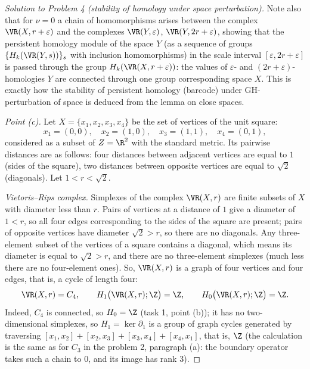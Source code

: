 \documentclass[a4paper,12pt]{report}
\begin{document}
\begin{proof}[Solution to Problem \textup{4} \textup{(}stability of homology under space perturbation\textup{)}]
Note also that for $\nu=0$ a chain of homomorphisms arises between the complex $\VR(X,r+\varepsilon)$ and the complexes $\VR(Y,\varepsilon)$, $\VR(Y,2r+\varepsilon)$, showing that the persistent homology module of the space $Y$ \textup{(}as a sequence of groups $\{H_k(\VR(Y,s))\}_s$ with inclusion homomorphisms\textup{)} in the scale interval $[\varepsilon,2r+\varepsilon]$ is passed through the group $H_k(\VR(X,r+\varepsilon))$: the values of $\varepsilon$- and $(2r+\varepsilon)$-homologies $Y$ are connected through one group corresponding space $X$. This is exactly how the stability of persistent homology \textup{(}barcode\textup{)} under GH-perturbation of space is deduced from the lemma on close spaces.

\textit{Point \textup{(c)}.} Let $X=\{x_1,x_2,x_3,x_4\}$ be the set of vertices of the unit square:
\[
x_1=(0,0),\quad x_2=(1,0),\quad x_3=(1,1),\quad x_4=(0,1),
\]
considered as a subset of $Z=\R^2$ with the standard metric. Its pairwise distances are as follows: four distances between adjacent vertices are equal to $1$ \textup{(}sides of the square\textup{)}, two distances between opposite vertices are equal to $\sqrt2$ \textup{(}diagonals\textup{)}. Let $1<r<\sqrt2$.

\emph{Vietoris--Rips complex.} Simplexes of the complex $\VR(X,r)$ are finite subsets of $X$ with diameter less than $r$. Pairs of vertices at a distance of $1$ give a diameter of $1<r$, so all four edges corresponding to the sides of the square are present; pairs of opposite vertices have diameter $\sqrt2>r$, so there are no diagonals. Any three-element subset of the vertices of a square contains a diagonal, which means its diameter is equal to $\sqrt2>r$, and there are no three-element simplexes \textup{(}much less there are no four-element ones\textup{)}. So, $\VR(X,r)$ is a graph of four vertices and four edges, that is, a cycle of length four:
\[
\VR(X,r)=C_4,\qquad H_1\bigl(\VR(X,r);\Z\bigr)=\Z,\qquad H_0\bigl(\VR(X,r);\Z\bigr)=\Z .
\]
Indeed, $C_4$ is connected, so $H_0=\Z$ \textup{(}task \textup{1}, point \textup{(b)}\textup{)}; it has no two-dimensional simplexes, so $H_1=\ker\partial_1$ is a group of graph cycles generated by traversing $[x_1,x_2]+[x_2,x_3]+[x_3,x_4]+[x_4,x_1]$, that is, $\Z$ \textup{(}the calculation is the same as for $C_3$ in the problem \textup{2}, paragraph \textup{(a)}: the boundary operator takes such a chain to $0$, and its image has rank $3$\textup{)}.


\end{proof}
\end{document}
